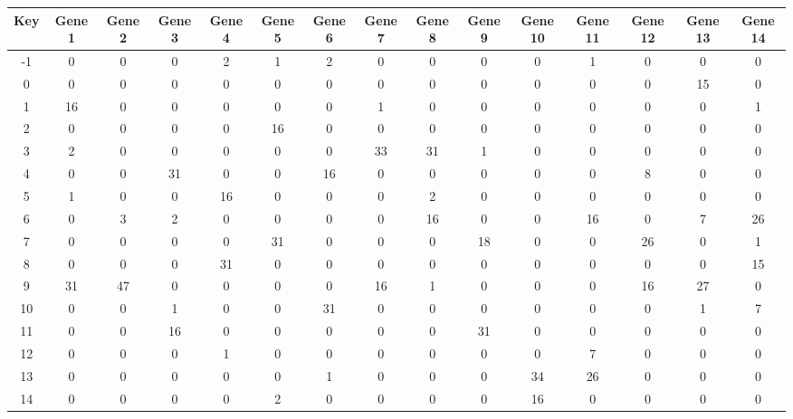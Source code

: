 \begin{tabular}{|c|c|c|c|c|c|c|c|c|c|c|c|c|c|c|}
\hline
Key & Gene 1 & Gene 2 & Gene 3 & Gene 4 & Gene 5 & Gene 6 & Gene 7 & Gene 8 & Gene 9 & Gene 10 & Gene 11 & Gene 12 & Gene 13 & Gene 14 \\
\hline
-1 & 0 & 0 & 0 & 2 & 1 & 2 & 0 & 0 & 0 & 0 & 1 & 0 & 0 & 0 \\
0 & 0 & 0 & 0 & 0 & 0 & 0 & 0 & 0 & 0 & 0 & 0 & 0 & 15 & 0 \\
1 & 16 & 0 & 0 & 0 & 0 & 0 & 1 & 0 & 0 & 0 & 0 & 0 & 0 & 1 \\
2 & 0 & 0 & 0 & 0 & 16 & 0 & 0 & 0 & 0 & 0 & 0 & 0 & 0 & 0 \\
3 & 2 & 0 & 0 & 0 & 0 & 0 & 33 & 31 & 1 & 0 & 0 & 0 & 0 & 0 \\
4 & 0 & 0 & 31 & 0 & 0 & 16 & 0 & 0 & 0 & 0 & 0 & 8 & 0 & 0 \\
5 & 1 & 0 & 0 & 16 & 0 & 0 & 0 & 2 & 0 & 0 & 0 & 0 & 0 & 0 \\
6 & 0 & 3 & 2 & 0 & 0 & 0 & 0 & 16 & 0 & 0 & 16 & 0 & 7 & 26 \\
7 & 0 & 0 & 0 & 0 & 31 & 0 & 0 & 0 & 18 & 0 & 0 & 26 & 0 & 1 \\
8 & 0 & 0 & 0 & 31 & 0 & 0 & 0 & 0 & 0 & 0 & 0 & 0 & 0 & 15 \\
9 & 31 & 47 & 0 & 0 & 0 & 0 & 16 & 1 & 0 & 0 & 0 & 16 & 27 & 0 \\
10 & 0 & 0 & 1 & 0 & 0 & 31 & 0 & 0 & 0 & 0 & 0 & 0 & 1 & 7 \\
11 & 0 & 0 & 16 & 0 & 0 & 0 & 0 & 0 & 31 & 0 & 0 & 0 & 0 & 0 \\
12 & 0 & 0 & 0 & 1 & 0 & 0 & 0 & 0 & 0 & 0 & 7 & 0 & 0 & 0 \\
13 & 0 & 0 & 0 & 0 & 0 & 1 & 0 & 0 & 0 & 34 & 26 & 0 & 0 & 0 \\
14 & 0 & 0 & 0 & 0 & 2 & 0 & 0 & 0 & 0 & 16 & 0 & 0 & 0 & 0 \\
\hline
\end{tabular}